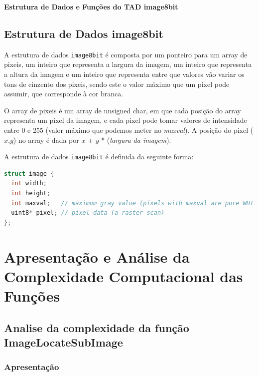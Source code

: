 \documentclass{report}
\begin{document}
\hfill

\hfill

\hfill

\hspace{-7mm}
{\LARGE\textbf{Estrutura de Dados e Funções do TAD image8bit}}

\section{Estrutura de Dados image8bit}

A estrutura de dados \texttt{image8bit} é composta por um ponteiro para um array de pixeis, um inteiro que representa a largura da imagem, um inteiro que representa a altura da imagem e um inteiro que representa entre que valores vão variar os tons de cinzento dos pixeis, sendo este o valor máximo que um pixel pode assumir, que corresponde à cor branca.
\par
O array de pixeis é um array de unsigned char, em que cada posição do array representa um pixel da imagem, e cada pixel pode tomar valores de intensidade entre 0 e 255 (valor máximo que podemos meter no \textit{maxval}). A posição do pixel (\(x\),\(y\)) no array é dada por \(x\) + \(y\) * (\textit{largura da imagem}).
\par
A estrutura de dados \texttt{image8bit} é definida da seguinte forma:

\begin{lstlisting}[language=C]
struct image {
  int width;
  int height;
  int maxval;   // maximum gray value (pixels with maxval are pure WHITE)
  uint8* pixel; // pixel data (a raster scan)
};
\end{lstlisting}




\chapter{Apresentação e Análise da Complexidade Computacional das Funções}

\section{Analise da complexidade da função ImageLocateSubImage}
\subsection{Apresentação}
\end{document}
